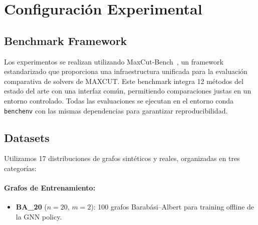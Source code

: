 \documentclass{article}
\begin{document}
\section{Configuración Experimental}

\subsection{Benchmark Framework}

Los experimentos se realizan utilizando MaxCut-Bench~\cite{nath2024benchmarkmaximumcutstandardization}, un framework estandarizado que proporciona una infraestructura unificada para la evaluación comparativa de solvers de MAXCUT. Este benchmark integra 12 métodos del estado del arte con una interfaz común, permitiendo comparaciones justas en un entorno controlado. Todas las evaluaciones se ejecutan en el entorno conda \texttt{benchenv} con las mismas dependencias para garantizar reproducibilidad.

\subsection{Datasets}

Utilizamos 17 distribuciones de grafos sintéticos y reales, organizadas en tres categorías:

\paragraph{Grafos de Entrenamiento:}
\begin{itemize}
    \item \textbf{BA\_20} ($n=20$, $m=2$): 100 grafos Barabási–Albert para training offline de la GNN policy.
\end{itemize}
\end{document}
